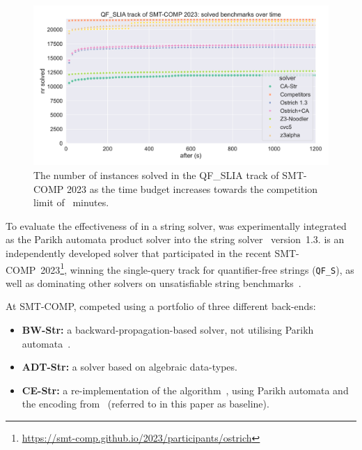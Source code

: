 \begin{figure}[t]
  \includegraphics[width=\linewidth]{graphs/smt-comp-cactus}
  \caption{The number of instances solved in the QF\_SLIA track of SMT-COMP 2023
   as the time budget increases towards the competition limit of ~minutes.}
  \label{fig:smt-comp:cactus}
\end{figure}

To evaluate the effectiveness of \Calculus{} in a string solver, \Catra{} was
experimentally integrated as the Parikh automata product solver into the string
solver \Ostrich{}~version~1.3. \Ostrich{} is an independently developed solver
that participated in the recent
SMT-COMP~2023\footnote{\url{https://smt-comp.github.io/2023/participants/ostrich}},
winning the single-query track for quantifier-free strings (\texttt{QF\_S}), as
well as dominating other solvers on unsatisfiable string
benchmarks~\cite{smt-comp-23}.

 At SMT-COMP, \Ostrich{} competed using a portfolio of three different
 back-ends:
\begin{itemize}
\item \textbf{BW-Str:} a backward-propagation-based solver, not utilising
  Parikh automata~\cite{ostrich}.
\item \textbf{ADT-Str:} a solver based on algebraic data-types.
\item \textbf{CE-Str:} a re-implementation of the \OstrichPlus{}
  algorithm~\cite{ostrich-plus}, using Parikh automata and the
  encoding from~\cite{generate-parikh-image} (referred to in this paper as baseline).
\end{itemize}

